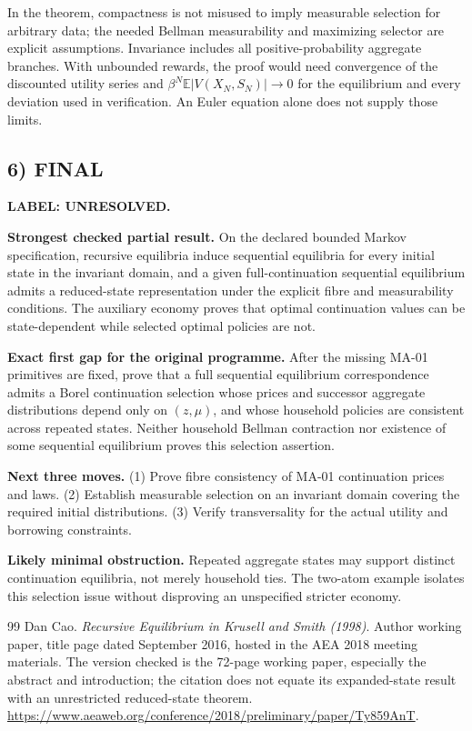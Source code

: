 \documentclass[11pt,a4paper]{article}
\newcommand{\E}{\mathbb E}
\theoremstyle{definition}
\newcommand{\unresolved}{\textbf{LABEL: UNRESOLVED.}}
\begin{document}
In the theorem, compactness is not misused to imply measurable selection for arbitrary data; the needed Bellman measurability and maximizing selector are explicit assumptions. Invariance includes all positive-probability aggregate branches. With unbounded rewards, the proof would need convergence of the discounted utility series and
$\beta^N\E|V(X_N,S_N)|\to0$ for the equilibrium and every deviation used in verification. An Euler equation alone does not supply those limits.

\subsection*{6) FINAL}
\unresolved

\textbf{Strongest checked partial result.} On the declared bounded Markov specification, recursive equilibria induce sequential equilibria for every initial state in the invariant domain, and a given full-continuation sequential equilibrium admits a reduced-state representation under the explicit fibre and measurability conditions. The auxiliary economy proves that optimal continuation values can be state-dependent while selected optimal policies are not.

\textbf{Exact first gap for the original programme.} After the missing MA-01 primitives are fixed, prove that a full sequential equilibrium correspondence admits a Borel continuation selection whose prices and successor aggregate distributions depend only on $(z,\mu)$, and whose household policies are consistent across repeated states. Neither household Bellman contraction nor existence of some sequential equilibrium proves this selection assertion.

\textbf{Next three moves.} (1) Prove fibre consistency of MA-01 continuation prices and laws. (2) Establish measurable selection on an invariant domain covering the required initial distributions. (3) Verify transversality for the actual utility and borrowing constraints.

\textbf{Likely minimal obstruction.} Repeated aggregate states may support distinct continuation equilibria, not merely household ties. The two-atom example isolates this selection issue without disproving an unspecified stricter economy.

\clearpage
\begin{thebibliography}{99}
Dan Cao. \emph{Recursive Equilibrium in Krusell and Smith (1998)}. Author working paper, title page dated September 2016, hosted in the AEA 2018 meeting materials. The version checked is the 72-page working paper, especially the abstract and introduction; the citation does not equate its expanded-state result with an unrestricted reduced-state theorem. \url{https://www.aeaweb.org/conference/2018/preliminary/paper/Ty859AnT}.

\end{thebibliography}
\end{document}
